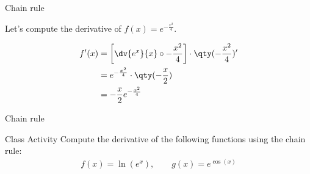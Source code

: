\documentclass[../tufte-style.tex]{standalone}
\begin{document}
\begin{frame}{Chain rule}
\begin{examples}
Let's compute the derivative of \(f(x) = e^{-\frac{x^2}{4}}\).

\begin{align*}
    f'(x) &= \left[\dv{e^{x}}{x}\circ-\frac{x^2}{4}\right]\cdot\qty(-\frac{x^2}{4})' \\
          &= e^{-\frac{x^2}{4}}\cdot\qty(-\frac{x}{2}) \\
          &= -\frac{x}{2}e^{-\frac{x^2}{4}}
\end{align*}

\end{examples}
\end{frame}

\begin{frame}{Chain rule}

\begin{block}{Class Activity}
    Compute the derivative of the following functions using the chain rule:
    \begin{gather*}
        f(x) = \ln(e^x),\qquad g(x) = e^{\cos(x)}
    \end{gather*}
\end{block}

\end{frame}
\end{document}

